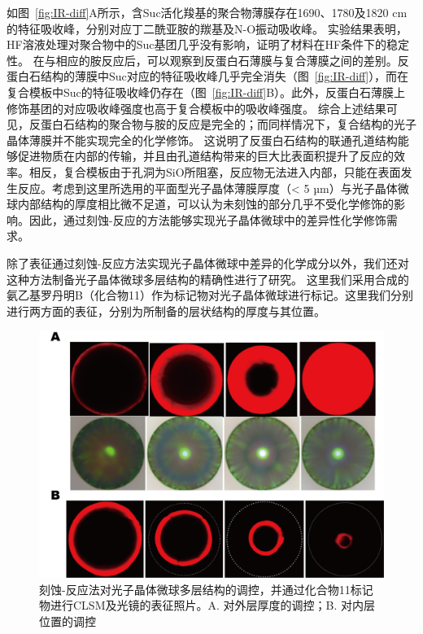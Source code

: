 如图~\ref{fig:IR-diff}A所示，含Suc活化羧基的聚合物薄膜存在1690、1780及1820 cm的特征吸收峰，分别对应丁二酰亚胺的羰基及N-O振动吸收峰\cite{Guerrouache2012SiteSpecific}。
实验结果表明，HF溶液处理对聚合物中的Suc基团几乎没有影响，证明了材料在HF条件下的稳定性。
在与相应的胺反应后，可以观察到反蛋白石薄膜与复合薄膜之间的差别。反蛋白石结构的薄膜中Suc对应的特征吸收峰几乎完全消失（图~\ref{fig:IR-diff}），而在复合模板中Suc的特征吸收峰仍存在（图~\ref{fig:IR-diff}B）。此外，反蛋白石薄膜上修饰基团的对应吸收峰强度也高于复合模板中的吸收峰强度。
综合上述结果可见，反蛋白石结构的聚合物与胺的反应是完全的；而同样情况下，复合结构的光子晶体薄膜并不能实现完全的化学修饰。
这说明了反蛋白石结构的联通孔道结构能够促进物质在内部的传输，并且由孔道结构带来的巨大比表面积提升了反应的效率。相反，复合模板由于孔洞为SiO所阻塞，反应物无法进入内部，只能在表面发生反应。考虑到这里所选用的平面型光子晶体薄膜厚度（< 5 µm）与光子晶体微球内部结构的厚度相比微不足道，可以认为未刻蚀的部分几乎不受化学修饰的影响。因此，通过刻蚀-反应的方法能够实现光子晶体微球中的差异性化学修饰需求。

除了表征通过刻蚀-反应方法实现光子晶体微球中差异的化学成分以外，我们还对这种方法制备光子晶体微球多层结构的精确性进行了研究。
这里我们采用合成的氨乙基罗丹明B（化合物11）作为标记物对光子晶体微球进行标记。这里我们分别进行两方面的表征，分别为所制备的层状结构的厚度与其位置。

\begin{figure}[htbp]
  \centering
  \includegraphics[width=\linewidth]{figures/ch5/RhB-dye.png}
  \caption{刻蚀-反应法对光子晶体微球多层结构的调控，并通过化合物11标记物进行CLSM及光镜的表征照片。A. 对外层厚度的调控；B. 对内层位置的调控 }
  \label{fig:RhB-dye}
\end{figure}

